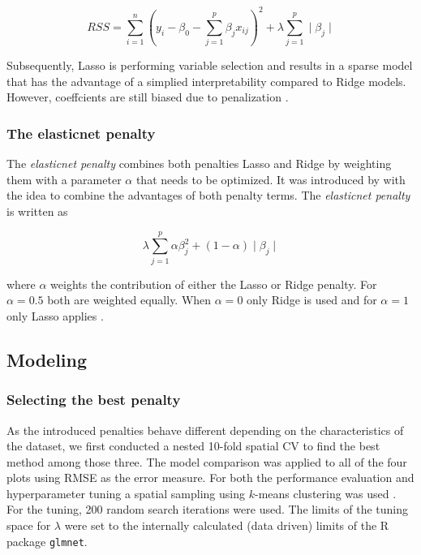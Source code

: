 \documentclass[review]{elsarticle}
\begin{document}
\begin{equation}
	RSS = \sum_{i=1}^{n} \left(y_{i} - \beta_{0} - \sum_{j=1}^{p} \beta_{j} x_{ij} \right) ^{2} + \lambda \sum_{j=1}^{p} \mid\beta_{j}\mid
\end{equation}

Subsequently, Lasso is performing variable selection and results in a sparse model that has the advantage of a simplied interpretability compared to Ridge models.
However, coeffcients are still biased due to penalization \citep{Hastie2001, James2013}.

\subsubsection{The elasticnet penalty}

The \textit{elasticnet penalty} combines both penalties Lasso and Ridge by weighting them with a parameter $\alpha$ that needs to be optimized.
It was introduced by \cite{Zou2005} with the idea to combine the advantages of both penalty terms.
The \textit{elasticnet penalty} is written as

\begin{equation}
	\lambda \sum_{j=1}^{p} \alpha\beta_{j}^{2} + (1 - \alpha) \mid\beta_{j}\mid
\end{equation}

where $\alpha$ weights the contribution of either the Lasso or Ridge penalty.
For $\alpha = 0.5$ both are weighted equally.
When $\alpha = 0$ only Ridge is used and for $\alpha = 1$ only Lasso applies \citep{Hastie2001}.

\subsection{Modeling}

\subsubsection{Selecting the best penalty}

As the introduced penalties behave different depending on the characteristics of the dataset, we first conducted a nested 10-fold spatial \ac{CV} to find the best method among those three.
The model comparison was applied to all of the four plots using \ac{RMSE} as the error measure.
For both the performance evaluation and hyperparameter tuning a spatial sampling using $k$-means clustering was used \citep{sperrorest}.
For the tuning, 200 random search iterations were used.
The limits of the tuning space for $\lambda$ were set to the internally calculated (data driven) limits of the R package \texttt{glmnet}.
\end{document}
